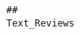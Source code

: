 \documentclass[
]{article}
\begin{document}
\begin{verbatim}
##                                                                                                                                                                                                                                                                                                                                                                                                                                                                                                                                                                                                                                                                                                                                                                                                                                                                                                                                                                                                                                                                                                                                                                                                                                                                                                                                                                                                                                                                                                                                                                                                                                                                                                                                                                                                                                                                                                                                                                                                                                                                                                                                                                                                        Text_Reviews

\end{verbatim}
\end{document}

